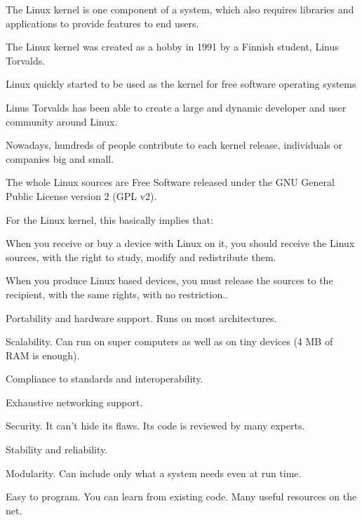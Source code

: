 

  \startitemize
  \item The Linux kernel is one component of a system, which also
    requires libraries and applications to provide features to end
    users.
  \item The Linux kernel was created as a hobby in 1991 by a Finnish
    student, Linus Torvalds.
    \startitemize
    \item Linux quickly started to be used as the kernel for free
      software operating systems
    \stopitemize
  \item Linus Torvalds has been able to create a large and dynamic
    developer and user community around Linux.
  \item Nowadays, hundreds of people contribute to each kernel
    release, individuals or companies big and small.
  \stopitemize

  \startitemize
  \item The whole Linux sources are Free Software released under the
    GNU General Public License version 2 (GPL v2).
  \item For the Linux kernel, this basically implies that:
    \startitemize
    \item When you receive or buy a device with Linux on it, you
      should receive the Linux sources, with the right to study,
      modify and redistribute them.
    \item When you produce Linux based devices, you must release the
      sources to the recipient, with the same rights, with no
      restriction..
    \stopitemize
  \stopitemize

    \startitemize
    \item Portability and hardware support. Runs on most
      architectures.
    \item Scalability. Can run on super computers as well as on tiny
      devices (4 MB of RAM is enough).
    \item Compliance to standards and interoperability.
    \item Exhaustive networking support.
    \stopitemize
    \startitemize
    \item Security. It can't hide its flaws. Its code is reviewed by
      many experts.
    \item Stability and reliability.
    \item Modularity. Can include only what a system needs even at run
      time.
    \item Easy to program. You can learn from existing code. Many
      useful resources on the net.
    \stopitemize

